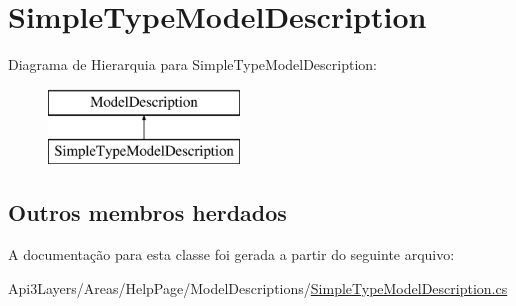 \hypertarget{classApi3Layers_1_1Areas_1_1HelpPage_1_1ModelDescriptions_1_1SimpleTypeModelDescription}{}\section{Simple\+Type\+Model\+Description}
\label{classApi3Layers_1_1Areas_1_1HelpPage_1_1ModelDescriptions_1_1SimpleTypeModelDescription}
Diagrama de Hierarquia para Simple\+Type\+Model\+Description\+:\begin{figure}[H]
\begin{center}
\leavevmode
\includegraphics[height=2.000000cm]{classApi3Layers_1_1Areas_1_1HelpPage_1_1ModelDescriptions_1_1SimpleTypeModelDescription}
\end{center}
\end{figure}
\subsection*{Outros membros herdados}


A documentação para esta classe foi gerada a partir do seguinte arquivo\+:\begin{DoxyCompactItemize}
\item 
Api3\+Layers/\+Areas/\+Help\+Page/\+Model\+Descriptions/\hyperlink{SimpleTypeModelDescription_8cs}{Simple\+Type\+Model\+Description.\+cs}\end{DoxyCompactItemize}
